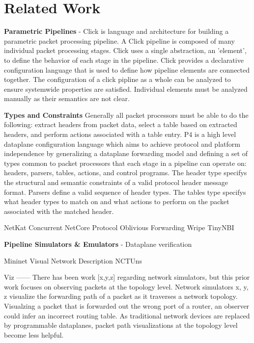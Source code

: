 \section{Related Work}


\textbf{Parametric Pipelines} - Click \cite{click} is language and architecture 
for building a parametric packet processing pipeline. A Click pipeline is 
composed of many individual packet processing stages. Click uses a single 
abstraction, an 'element', to define the behavior of each stage in the pipeline.
Click provides a declarative configuration language that is used to define
how pipeline elements are connected together. The configuration of a click
pipline as a whole can be analyzed to ensure systemwide properties are
satisfied. Individual elements must be analyzed manually as their semantics
are not clear. 

\textbf{Types and Constraints}
Generally all packet processors must be able to do the 
following: extract headers from packet data, select a table based on extracted 
headers, and perform actions associated with a table entry. P4\cite{p4} is a 
high level dataplane configuration language which aims to
achieve protocol and platform independence by generalizing a dataplane 
forwarding model and defining a set of types common to packet processors that 
each stage in a pipeline can operate on: headers, parsers, tables, actions, and
control programs. The header type specifys the structural and semantic 
constraints of a valid protocol header message format. Parsers define a valid 
sequence of header types. The tables type specifys what header types to match 
on and what actions to perform on the packet associated with the matched header.

NetKat\cite{netkat}
Concurrent NetCore\cite{cnetcore}
Protocol Oblivious Forwarding\cite{pof}
Wripe \cite{wripe}
TinyNBI \cite{tinynbi}

\textbf{Pipeline Simulators \& Emulators} -
Dataplane verification


Mininet\cite{mininet}
Visual Network Description \cite{vnd}
NCTUns \cite{nctuns}

Viz
------
There has been work [x,y,z] regarding network simulators, but this prior work focuses on observing packets at the topology level. Network simulators x, y, z visualize the forwarding path of a packet as it traverses a network topology. Visualzing a packet that is forwarded out the wrong port of a router, an observer could infer an incorrect routing table. As traditional network devices are replaced by programmable dataplanes, packet path visualizations at the topology level become less helpful.

